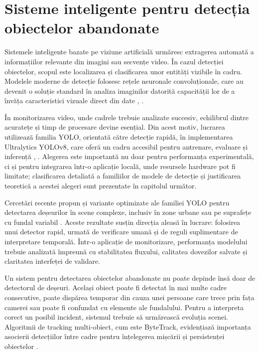 \section{Sisteme inteligente pentru detecția obiectelor abandonate}

Sistemele inteligente bazate pe viziune artificială urmăresc extragerea automată a informațiilor relevante din imagini sau secvențe video. În cazul detecției obiectelor, scopul este localizarea și clasificarea unor entități vizibile în cadru. Modelele moderne de detecție folosesc rețele neuronale convoluționale, care au devenit o soluție standard în analiza imaginilor datorită capacității lor de a învăța caracteristici vizuale direct din date \cite{lecun1998gradient}, \cite{krizhevsky2012imagenet}.

În monitorizarea video, unde cadrele trebuie analizate succesiv, echilibrul dintre acuratețe și timp de procesare devine esențial. Din acest motiv, lucrarea utilizează familia YOLO, orientată către detecție rapidă, în implementarea Ultralytics YOLOv8, care oferă un cadru accesibil pentru antrenare, evaluare și inferență \cite{redmon2016yolo}, \cite{ultralytics2023yolov8}. Alegerea este importantă nu doar pentru performanța experimentală, ci și pentru integrarea într-o aplicație locală, unde resursele hardware pot fi limitate; clasificarea detaliată a familiilor de modele de detecție și justificarea teoretică a acestei alegeri sunt prezentate în capitolul următor.

Cercetări recente propun și variante optimizate ale familiei YOLO pentru detectarea deșeurilor în scene complexe, inclusiv în zone urbane sau pe suprafețe cu fundal variabil \cite{liu2024ecodetect}. Aceste rezultate susțin direcția aleasă în lucrare: folosirea unui detector rapid, urmată de verificare umană și de reguli suplimentare de interpretare temporală. Într-o aplicație de monitorizare, performanța modelului trebuie analizată împreună cu stabilitatea fluxului, calitatea dovezilor salvate și claritatea interfeței de validare.

Un sistem pentru detectarea obiectelor abandonate nu poate depinde însă doar de detectorul de deșeuri. Același obiect poate fi detectat în mai multe cadre consecutive, poate dispărea temporar din cauza unei persoane care trece prin fața camerei sau poate fi confundat cu elemente ale fundalului. Pentru a interpreta corect un posibil incident, sistemul trebuie să urmărească evoluția scenei. Algoritmii de tracking multi-obiect, cum este ByteTrack, evidențiază importanța asocierii detecțiilor între cadre pentru înțelegerea mișcării și persistenței obiectelor \cite{zhang2022bytetrack}.

